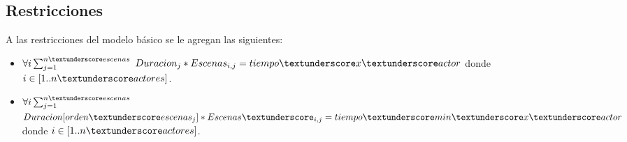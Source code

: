 \documentclass{article}
\begin{document}
\subsection{Restricciones}
A las restricciones del modelo básico se le agregan las siguientes:
\begin{itemize}
    \item $\forall i\sum_{j=1}^{n\textunderscore escenas}$  $Duracion_j * Escenas_{i,j} = tiempo\textunderscore x\textunderscore actor$\newline
          donde $i \in [1..n\textunderscore actores]$.
    \item $\forall i\sum_{j=1}^{n\textunderscore escenas}$  $Duracion[orden\textunderscore escenas_j] * Escenas\textunderscore_{i,j} = tiempo\textunderscore min\textunderscore x\textunderscore actor$\newline
          donde $i \in [1..n\textunderscore actores]$.
\end{itemize}
\end{document}
